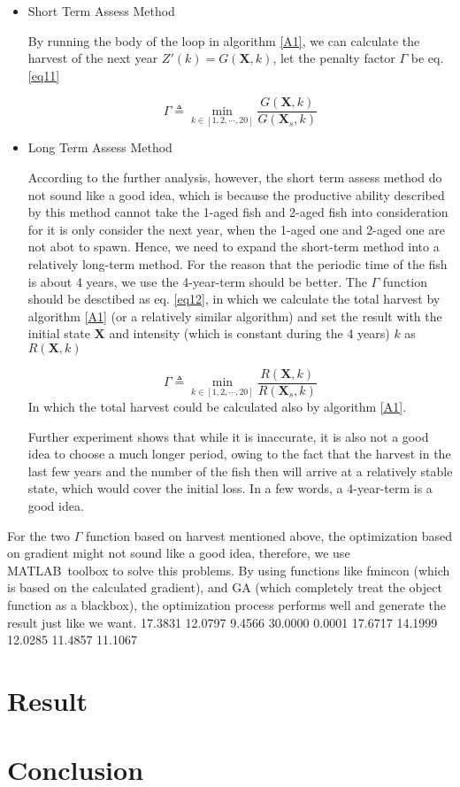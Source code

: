 \documentclass{IEEEtran}
\begin{document}
\begin{itemize}
    \item {Short Term Assess Method

    By running the body of the loop in algorithm \ref{A1}, we can calculate the harvest of the next year $Z'(k) = G(\bm X,k)$, let the penalty factor $\Gamma$ be eq. \ref{eq11}
    
    \begin{equation}
        \label{eq11}
        \Gamma \triangleq \min_{k \in[1,2,\cdots,20]} \frac{G(\bm X,k)}{G(\bm X_s,k)}
    \end{equation}
    }

    \item {Long Term Assess Method
        
    According to the further analysis, however, the short term assess method do not sound like a good idea, which is because the productive ability described by this method cannot take the 1-aged fish and 2-aged fish into consideration for it is only consider the next year, when the 1-aged one and 2-aged one are not abot to spawn. Hence, we need to expand the short-term method into a relatively long-term method. For the reason that the periodic time of the fish is about 4 years, we use the 4-year-term should be better. The $\Gamma$ function should be desctibed as eq. \ref{eq12}, in which we calculate the total harvest by algorithm \ref{A1} (or a relatively similar algorithm) and set the result with the initial state $\bm X$ and intensity (which is constant during the 4 years) $k$ as $R(\bm X,k)$
    
    \begin{equation}
        \label{eq12}
        \Gamma \triangleq \min_{k \in[1,2,\cdots,20]} \frac{R(\bm X,k)}{R(\bm X_s,k)}
    \end{equation}
    In which the total harvest could be calculated also by algorithm \ref{A1}.

    Further experiment shows that while it is inaccurate, it is also not a good idea to choose a much longer period, owing to the fact that the harvest in the last few years and the number of the fish then will arrive at a relatively stable state, which would cover the initial loss. In a few words, a 4-year-term is a good idea.
        }
\end{itemize}

For the two $\Gamma$ function based on harvest mentioned above, the optimization based on gradient might not sound like a good idea, therefore, we use MATLAB\textsuperscript\textregistered \ toolbox to solve this problems. By using functions like fmincon (which is based on the calculated gradient), and GA (which completely treat the object function as a blackbox), the optimization process performs well and generate the result just like we want.
17.3831   12.0797    9.4566   30.0000    0.0001
17.6717   14.1999   12.0285   11.4857   11.1067
\section{Result}
\section{Conclusion}
\end{document}
